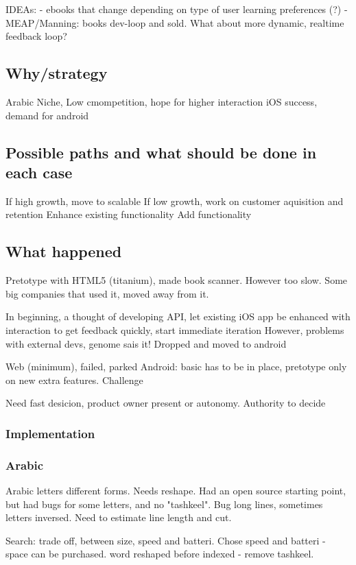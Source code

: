 \documentclass[a4paper,10pt]{book}
\begin{document}
 IDEAs: 
 - ebooks that change depending on type of user learning preferences (?)
 - MEAP/Manning: books dev-loop and sold. What about more dynamic, realtime feedback loop?
 

\subsection{Why/strategy}

 Arabic Niche, Low cmompetition, hope for higher interaction
 iOS success, demand for android

\subsection{Possible paths and what should be done in each case}
If high growth, move to scalable
If low growth, work on customer aquisition and retention
Enhance existing functionality
Add functionality 

\subsection{What happened}
Pretotype with HTML5 (titanium), made book scanner. However too slow.
Some big companies that used it, moved away from it.


In beginning, a thought of developing API, let existing iOS app be enhanced with interaction to get feedback quickly, start immediate iteration
However, problems with external devs, genome sais it!
Dropped and moved to android

Web (minimum), failed, parked
Android: basic has to be in place, pretotype only on new extra features. Challenge


Need fast desicion, product owner present or autonomy.
Authority to decide

\subsubsection{Implementation}
\subsubsection{Arabic}
Arabic letters different forms. Needs reshape. Had an open source starting point, but had bugs for some letters, and no "tashkeel".
Bug long lines, sometimes letters inversed.
Need to estimate line length and cut.

Search: trade off, between size, speed and batteri. Chose speed and batteri - space can be purchased.
word reshaped before indexed - remove tashkeel.
\end{document}
